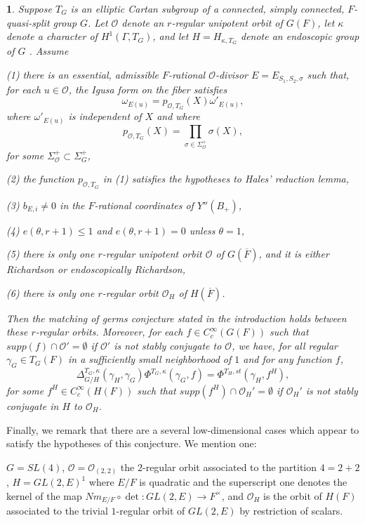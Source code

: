 \documentclass[12pt,letterpaper]{amsart}
\newcommand{\proclaimname}{}
\newtheorem*{proclaimx}{\proclaimname}
\newenvironment{proclaim}[1]%
  {\renewcommand{\proclaimname}{#1}\begin{proclaimx}}{\end{proclaimx}}
\begin{document}
\begin{proclaim}{Conjecture 9.1} Suppose $T_G$ is an elliptic Cartan subgroup
of a connected, simply connected, $F$-quasi-split group $G$. Let
${\mathcal O}$ denote an $r$-regular unipotent orbit of $G(F)$,
let $\kappa$ denote a character of $H^1(\Gamma,T_G)$, and let
$H=H_{\kappa,T_G}$ denote an endoscopic group of $G$ \cite{La79}.
Assume

(1) there is an essential, admissible $F$-rational ${\mathcal O}$-divisor
$E=E_{S_1,S_2,\sigma}$ such that, for each $u\in {\mathcal O}$, the
Igusa form on the fiber satisfies
\[
\omega_{E(u)}=p_{{\mathcal O},T_G}(X)\omega'_{E(u)},
\]
where $\omega'_{E(u)}$ is independent of $X$ and where
\[
p_{{\mathcal O},T_G}(X)=\prod_{\sigma\in\Sigma_{\mathcal O}^+}\sigma(X),
\]
for some $\Sigma_{\mathcal O}^+\subset \Sigma_G^+$,

(2) the function $p_{{\mathcal O},T_G}$ in (1) satisfies the hypotheses to
Hales' reduction lemma,

(3) $b_{E,i}\not= 0$ in the $F$-rational coordinates of $Y''(B_+)$,

(4) $e(\theta,r+1)\leq 1$ and $e(\theta,r+1)=0$ unless $\theta =1$,

(5) there is only one $r$-regular unipotent orbit ${\mathcal O}$
of $G(\overline{F})$, and
it is either Richardson or endoscopically Richardson,

(6) there is only one $r$-regular orbit ${\mathcal O}_H$ of $H(\overline{F})$.

Then the matching of germs conjecture stated in the introduction
holds between these $r$-regular orbits. Moreover,
for each $f\in C_c^\infty (G(F))$ such that
$supp(f)\cap {\mathcal O}'=\emptyset$ if ${\mathcal O}'$
is not stably conjugate to ${\mathcal O}$, we have,
for all regular $\gamma_G\in T_G(F)$
in a sufficiently small neighborhood of $1$ and for any
function $f$,
\[
\Delta_{G/H}^{T_G,\kappa}(\gamma_H,\gamma_G)
\Phi^{T_G,\kappa}(\gamma_G,f)=
\Phi^{T_H,st}(\gamma_H,f^H),
\]
for some $f^H\in C_c^\infty (H(F))$ such that
$supp(f^H)\cap {\mathcal O}_H'=\emptyset$ if ${\mathcal O}_H'$
is not stably conjugate in $H$ to ${\mathcal O}_H$.
\end{proclaim}

Finally, we remark that there are a several low-dimensional cases which
appear to
satisfy the hypotheses of this conjecture. We mention one:

$G=SL(4)$, ${\mathcal O}={\mathcal O}_{(2,2)}$ the $2$-regular orbit associated
to the partition $4=2+2$, $H=GL(2,E)^1$ where $E/F$ is quadratic
and the superscript one denotes the kernel of the map
$Nm_{E/F}\circ \det :GL(2,E)\rightarrow F^{\times}$, and
${\mathcal O}_H$ is the orbit of $H(F)$ associated to the
trivial $1$-regular orbit of $GL(2,E)$ by restriction of scalars.
\end{document}
